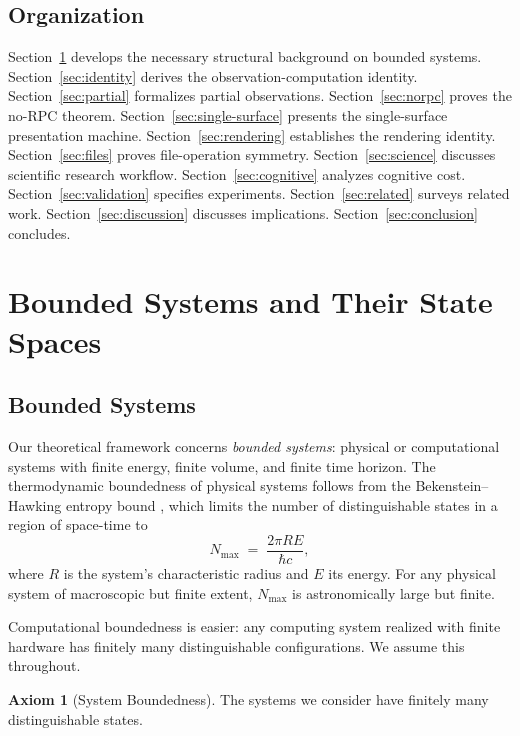 \documentclass[11pt,a4paper]{article}
\theoremstyle{definition}
\newtheorem{axiom}[theorem]{Axiom}
\theoremstyle{remark}
\begin{document}
\subsection{Organization}

Section~\ref{sec:bounded} develops the necessary structural background on bounded systems.
Section~\ref{sec:identity} derives the observation-computation identity.
Section~\ref{sec:partial} formalizes partial observations.
Section~\ref{sec:norpc} proves the no-RPC theorem.
Section~\ref{sec:single-surface} presents the single-surface presentation machine.
Section~\ref{sec:rendering} establishes the rendering identity.
Section~\ref{sec:files} proves file-operation symmetry.
Section~\ref{sec:science} discusses scientific research workflow.
Section~\ref{sec:cognitive} analyzes cognitive cost.
Section~\ref{sec:validation} specifies experiments.
Section~\ref{sec:related} surveys related work.
Section~\ref{sec:discussion} discusses implications.
Section~\ref{sec:conclusion} concludes.

\section{Bounded Systems and Their State Spaces}
\label{sec:bounded}

\subsection{Bounded Systems}

Our theoretical framework concerns \emph{bounded systems}: physical or computational systems with finite energy, finite volume, and finite time horizon. The thermodynamic boundedness of physical systems follows from the Bekenstein--Hawking entropy bound \citep{bekenstein1973black, hawking1975particle}, which limits the number of distinguishable states in a region of space-time to
\begin{equation}
\label{eq:bekenstein}
N_{\max} \;=\; \frac{2 \pi R E}{\hbar c},
\end{equation}
where $R$ is the system's characteristic radius and $E$ its energy. For any physical system of macroscopic but finite extent, $N_{\max}$ is astronomically large but finite.

Computational boundedness is easier: any computing system realized with finite hardware has finitely many distinguishable configurations. We assume this throughout.

\begin{axiom}[System Boundedness]
\label{ax:bounded}
The systems we consider have finitely many distinguishable states.
\end{axiom}
\end{document}
